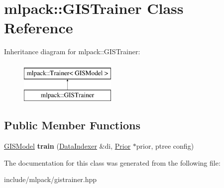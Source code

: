 \hypertarget{classmlpack_1_1_g_i_s_trainer}{
\section{mlpack::GISTrainer Class Reference}
\label{classmlpack_1_1_g_i_s_trainer}
}
Inheritance diagram for mlpack::GISTrainer:\begin{figure}[H]
\begin{center}
\leavevmode
\includegraphics[height=2.000000cm]{classmlpack_1_1_g_i_s_trainer}
\end{center}
\end{figure}
\subsection*{Public Member Functions}
\begin{DoxyCompactItemize}
\item 
\hypertarget{classmlpack_1_1_g_i_s_trainer_a57f2a11dfa5ae1a08044cd9e5319c216}{
\hyperlink{classmlpack_1_1_g_i_s_model}{GISModel} {\bfseries train} (\hyperlink{classmlpack_1_1_data_indexer}{DataIndexer} \&di, \hyperlink{classmlpack_1_1_prior}{Prior} $\ast$prior, ptree config)}
\label{classmlpack_1_1_g_i_s_trainer_a57f2a11dfa5ae1a08044cd9e5319c216}

\end{DoxyCompactItemize}


The documentation for this class was generated from the following file:\begin{DoxyCompactItemize}
\item 
include/mlpack/gistrainer.hpp\end{DoxyCompactItemize}
